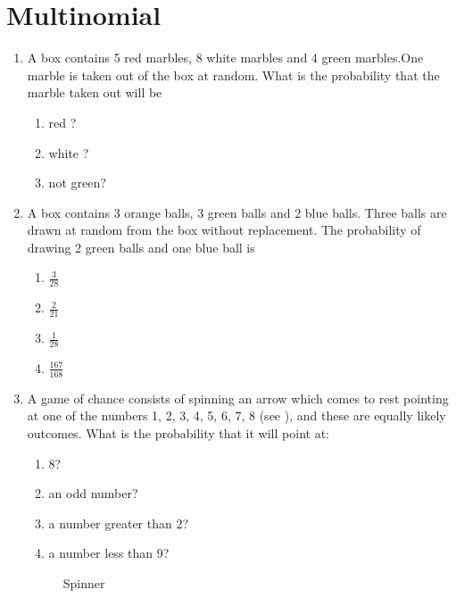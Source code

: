     \section{Multinomial}
\begin{enumerate}[label=\thesection.\arabic*,ref=\thesection.\theenumi]
\item A box contains 5 red marbles, 8 white marbles and 4 green marbles.One marble is taken
out of the box at random. What is the probability that the marble taken out will be 
\\
\solution
\begin{enumerate}
    \item red ? 
    \item white ? 
    \item  not green?
\end{enumerate}
\solution

\item A box contains 3 orange balls, 3 green balls and 2 blue balls. Three balls are drawn at random from the box without replacement. The probability of drawing 2 green balls and one blue ball is
\begin{enumerate}
\item $\frac{3}{28}$\\
\item $\frac{2}{21}$\\
\item $\frac{1}{28}$\\
\item $\frac{167}{168}$
\end{enumerate}

\item A game of chance consists of spinning an arrow
which comes to rest pointing at one of the numbers
1, 2, 3, 4, 5, 6, 7, 8 (see ), and these are equally
likely outcomes. What is the probability that it will
point at:
\begin{enumerate}
\item 
8?
\item 
an odd number?
\item 
a number greater than 2?
\item 
a number less than 9?
\end{enumerate}
\begin{figure} [p h]
	\centering
	\resizebox{\columnwidth}{!}{}
    \caption{Spinner}
    \label{fig:ncert/10/15/1/12/my_label}
\end{figure}
\solution


\end{enumerate}
